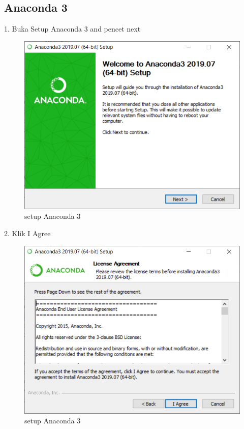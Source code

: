 \documentclass{article}
\begin{document}
\subsection{Anaconda 3}
1. Buka Setup Anaconda 3 and pencet next\\
\begin{figure}[h]
	\centering
		\includegraphics[scale=0.5]{Gambar/A1.PNG}
		\caption{setup Anaconda 3}
\end{figure}

2. Klik I Agree\\
\begin{figure}[h]
	\centering
		\includegraphics[scale=0.5]{Gambar/A2.PNG}
		\caption{setup Anaconda 3}
\end{figure}
\end{document}
